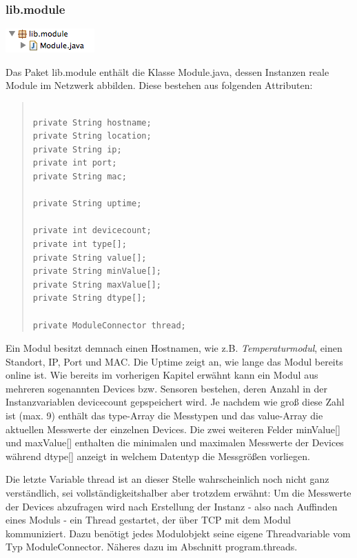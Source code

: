 \documentclass[a4paper,14pt,headsepline]{scrartcl}
\begin{document}
\newpage

\subsubsection*{lib.module}

\includegraphics[width=0.17 \paperwidth]{./bilder/lib_module.png}

Das Paket lib.module enthält die Klasse Module.java, dessen Instanzen reale Module im Netzwerk abbilden. Diese bestehen aus folgenden Attributen:

\begin{quote}
\begin{verbatim}

private String hostname;
private String location;
private String ip;
private int port;
private String mac;

private String uptime;

private int devicecount;		
private int type[];				
private String value[];			
private String minValue[];	
private String maxValue[];		
private String dtype[];			
	
private ModuleConnector thread;	

\end{verbatim}
\end{quote}

\newpage

Ein Modul besitzt demnach einen Hostnamen, wie z.B. \textit{Temperaturmodul}, einen Standort, IP, Port und MAC. Die Uptime zeigt an, wie lange das Modul bereits online ist. Wie bereits im vorherigen Kapitel erwähnt kann ein Modul aus mehreren sogenannten Devices bzw. Sensoren bestehen, deren Anzahl in der Instanzvariablen devicecount gepspeichert wird. Je nachdem wie groß diese Zahl ist (max. 9) enthält das type-Array die Messtypen und das value-Array die aktuellen Messwerte der einzelnen Devices. Die zwei weiteren Felder minValue[] und maxValue[] enthalten die minimalen und maximalen Messwerte der Devices während dtype[] anzeigt in welchem Datentyp die Messgrößen vorliegen. 

Die letzte Variable thread ist an dieser Stelle wahrscheinlich noch nicht ganz verständlich, sei vollständigkeitshalber aber trotzdem erwähnt: Um die Messwerte der Devices abzufragen wird nach Erstellung der Instanz - also nach Auffinden eines Moduls - ein Thread gestartet, der über TCP mit dem Modul kommuniziert. Dazu benötigt jedes Modulobjekt seine eigene Threadvariable vom Typ ModuleConnector. Näheres dazu im Abschnitt program.threads. 
\end{document}
